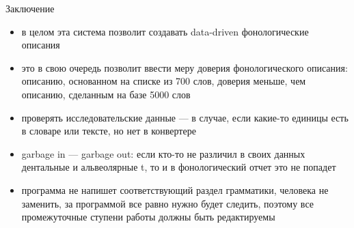\documentclass[13pt, t]{beamer}
\begin{document}
\begin{frame}{Заключение}
\begin{itemize}
\item в целом эта система позволит создавать data-driven фонологические описания
\item это в свою очередь позволит ввести меру доверия фонологического описания: описанию, основанном на списке из 700 слов, доверия меньше, чем описанию, сделанным на базе 5000 слов
\item проверять исследовательские данные --- в случае, если какие-то единицы есть в словаре или тексте, но нет в конвертере
\item garbage in --- garbage out: если кто-то не различил в своих данных дентальные и альвеолярные t, то и в фонологический отчет это не попадет
\item программа не напишет соответствующий раздел грамматики, человека не заменить, за программой все равно нужно будет следить, поэтому все промежуточные ступени работы должны быть редактируемы
\end{itemize}
\end{frame}

\end{document}
